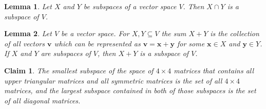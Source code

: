 \documentclass{article}
\newtheorem*{claim}{Claim}
\newtheorem{lemma}{Lemma}
\begin{document}
\begin{lemma}
    Let $X$ and $Y$ be subspaces of a vector space $V$. Then $X \cap Y$ is a subspace of $V$.
\end{lemma}

\begin{lemma}
    Let $V$ be a vector space. For $X, Y \subseteq V$ the sum $X + Y$ is the collection of all vectors
    $\mathbf{v}$ which can be represented as $\mathbf{v} = \mathbf{x} + \mathbf{y}$ for some 
    $\mathbf{x} \in X$ and $\mathbf{y} \in Y$. If $X$ and $Y$ are subspaces of $V$, then $X + Y$ is a subspace 
    of $V$.
\end{lemma}

\begin{claim}
    The smallest subspace of the space of $4 \times 4$ matrices that contains all upper triangular matrices 
    and all symmetric matrices is the set of all $4 \times 4$ matrices, and the largest subspace contained 
    in both of those subspaces is the set of all diagonal matrices.
\end{claim}
\end{document}
